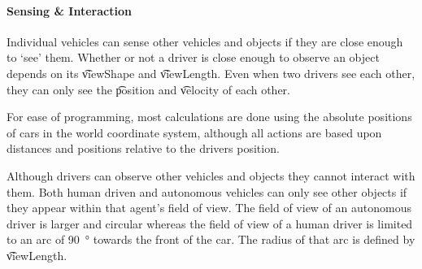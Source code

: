 

\paragraph{Sensing \& Interaction} 
Individual vehicles can sense other vehicles and objects if they are close enough to `see' them. Whether or not a driver is close enough to observe an object depends on its \t{viewShape} and \t{viewLength}. Even when two drivers see each other, they can only see the \t{position} and \t{velocity} of each other.

For ease of programming, most calculations are done using the absolute positions of cars in the world coordinate system, although all actions are based upon distances and positions relative to the drivers position.

Although drivers can observe other vehicles and objects they cannot interact with them. Both human driven and autonomous vehicles can only see other objects if they appear within that agent's field of view. The field of view of an autonomous driver is larger and circular whereas the field of view of a human driver is limited to an arc of \SI{90}{\degree} towards the front of the car. The radius of that arc is defined by \t{viewLength}.


